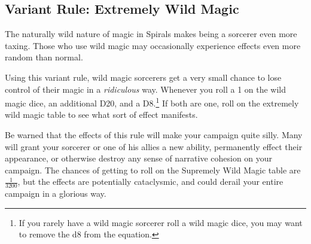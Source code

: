 \subsection{Variant Rule: Extremely Wild Magic}
The naturally wild nature of magic in Spirals makes being a sorcerer even more taxing.
Those who use wild magic may occasionally experience effects even more random than normal.

Using this variant rule, wild magic sorcerers get a very small chance to lose control of their magic in a \textit{ridiculous} way.
Whenever you roll a 1 on the wild magic dice, an additional D20, and a D8.\footnote{If you rarely have a wild magic sorcerer roll a wild magic dice, you may want to remove the d8 from the equation.}
If both are one, roll on the extremely wild magic table to see what sort of effect manifests.

Be warned that the effects of this rule will make your campaign quite silly.
Many will grant your sorcerer or one of his allies a new ability, permanently effect their appearance, or otherwise destroy any sense of narrative cohesion on your campaign.
The chances of getting to roll on the Supremely Wild Magic table are $ \frac{1}{3200} $, but the effects are potentially cataclysmic, and could derail your entire campaign in a glorious way.

